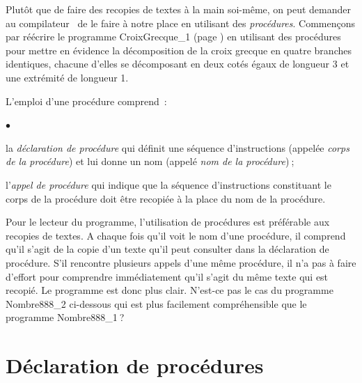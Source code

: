 Plutôt que de faire des recopies de textes à la main soi-même, on peut 
demander au compilateur \ocaml\ de le faire à  notre place en utilisant 
des {\em procédures}. Commençons par réécrire le programme 
{\idt CroixGrecque\_1} (page \pageref{prog:CroixGrecque_1}) en uti\-li\-sant des procédures pour mettre en 
évidence la décomposition de la croix grecque en 
quatre bran\-ches identiques, chacune d'elles se décomposant en deux 
cotés égaux de lon\-gueur 3 et une extrémité de lon\-gueur 1.

\newpage
\vspace*{3cm}%
\vspace*{-3cm}%


\noindent L'emploi d'une procédure comprend~:
\begin{list}{$\scriptscriptstyle\bullet$}{
}
\item la {\em déclaration de procédure} qui définit une séquence 
d'instructions (appelée {\em corps de la procédure}) et lui donne un 
nom (appelé {\em nom de la procédure})$\:$;
\item l'{\em appel de procédure} qui indique que la séquence 
d'instructions cons\-ti\-tuant le corps de la procédure doit être recopiée 
à la place du nom de la procédure.
\end{list}

\noindent Pour le lecteur du programme, l'utilisation de procédures est 
préférable aux recopies de textes. A chaque fois qu'il voit le
nom d'une procédure, il comprend qu'il s'agit de la copie d'un texte
qu'il peut consulter dans la déclaration de procédure. S'il rencontre
plusieurs appels d'une même procédure, il n'a pas à faire d'effort 
pour comprendre immédiatement qu'il s'agit du même texte qui est
recopié. Le programme est donc plus clair. N'est-ce pas le cas du
programme {\idt Nombre888\_2} ci-dessous qui est plus facilement 
compréhensible que le programme {\idt Nombre888\_1}$\:$? 

\vspace{\baselineskip}
\vspace*{2cm}%
\vspace*{-2cm}%


\section{Déclaration de procédures} 

